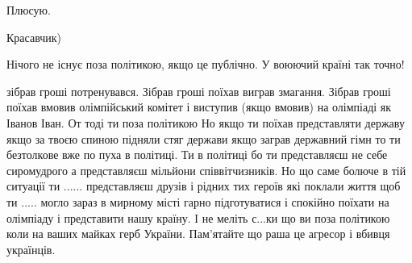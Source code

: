 \begin{itemize}
Плюсую.

 
Красавчик)

 
Нічого не існує поза політикою, якщо це публічно. У воюючий країні так точно!


зібрав гроші потренувався. Зібрав гроші поїхав виграв змагання. Зібрав гроші
поїхав вмовив олімпійський комітет і виступив (якщо вмовив) на олімпіаді як
Іванов Іван. От тоді ти поза політикою Но якщо ти поїхав представляти державу
якщо за твоєю спиною підняли стяг держави якщо заграв державний гімн то ти
безтолкове вже по пуха в політиці. Ти в політиці бо ти представляєш не себе
сиромудрого а представляєш мільйони співвітчизників. Но що саме болюче в тій
ситуації ти ...... представляєш друзів і рідних тих героїв які поклали життя
щоб ти ..... могло зараз в мирному місті гарно підготуватися і спокійно поїхати
на олімпіаду і представити нашу країну. І не меліть с...ки що ви поза політикою
коли на ваших майках герб України. Пам'ятайте що раша це агресор і вбивця
українців.
 
\end{itemize}

